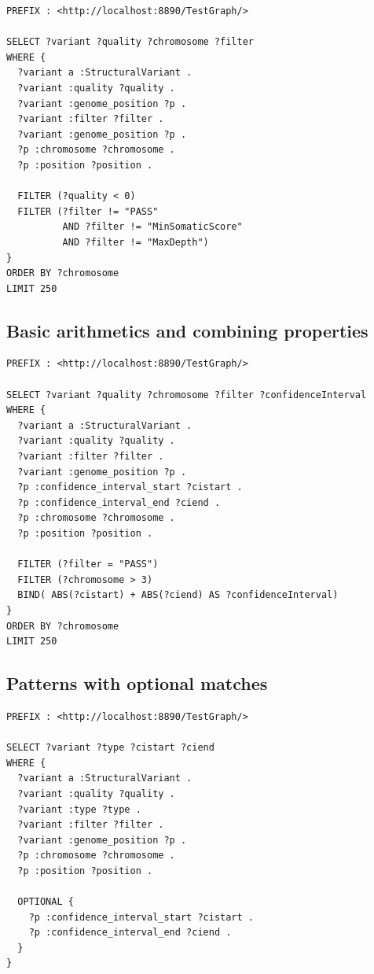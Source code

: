 \documentclass[11pt,a4paper,oneside]{book}
\begin{document}
\begin{siderules}
\begin{verbatim}
PREFIX : <http://localhost:8890/TestGraph/>

SELECT ?variant ?quality ?chromosome ?filter
WHERE {
  ?variant a :StructuralVariant .
  ?variant :quality ?quality .
  ?variant :genome_position ?p .
  ?variant :filter ?filter .
  ?variant :genome_position ?p .
  ?p :chromosome ?chromosome .
  ?p :position ?position .

  FILTER (?quality < 0)
  FILTER (?filter != "PASS" 
          AND ?filter != "MinSomaticScore"
          AND ?filter != "MaxDepth")
}
ORDER BY ?chromosome
LIMIT 250
\end{verbatim}
\end{siderules}

\subsection{Basic arithmetics and combining properties}

\begin{siderules}
\begin{verbatim}
PREFIX : <http://localhost:8890/TestGraph/>

SELECT ?variant ?quality ?chromosome ?filter ?confidenceInterval
WHERE {
  ?variant a :StructuralVariant .
  ?variant :quality ?quality .
  ?variant :filter ?filter .
  ?variant :genome_position ?p .
  ?p :confidence_interval_start ?cistart .
  ?p :confidence_interval_end ?ciend .
  ?p :chromosome ?chromosome .
  ?p :position ?position .

  FILTER (?filter = "PASS")
  FILTER (?chromosome > 3)
  BIND( ABS(?cistart) + ABS(?ciend) AS ?confidenceInterval)
}
ORDER BY ?chromosome
LIMIT 250
\end{verbatim}
\end{siderules}

\subsection{Patterns with optional matches}
\begin{siderules}
\begin{verbatim}
PREFIX : <http://localhost:8890/TestGraph/>

SELECT ?variant ?type ?cistart ?ciend
WHERE {
  ?variant a :StructuralVariant .
  ?variant :quality ?quality .
  ?variant :type ?type .
  ?variant :filter ?filter .
  ?variant :genome_position ?p .
  ?p :chromosome ?chromosome .
  ?p :position ?position .

  OPTIONAL {
    ?p :confidence_interval_start ?cistart .
    ?p :confidence_interval_end ?ciend .
  }
}
\end{verbatim}
\end{siderules}
\end{document}
